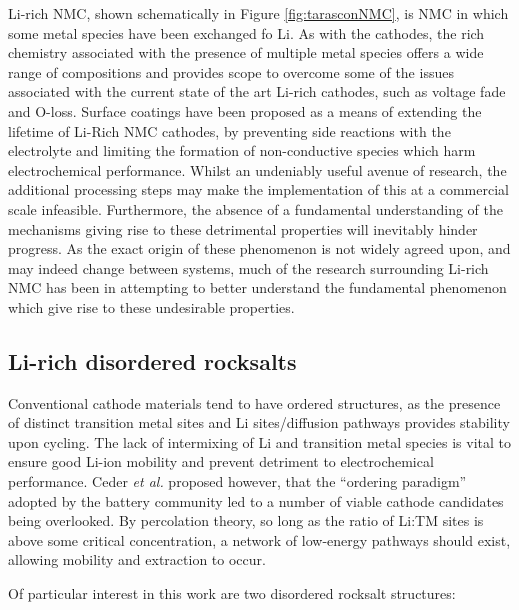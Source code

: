Li-rich NMC, shown schematically in Figure \ref{fig:tarasconNMC}, is NMC in which some metal species have been exchanged fo Li.
As with the  cathodes, the rich chemistry associated with the presence of multiple metal species offers a wide range of compositions and provides scope to overcome some of the issues associated with the current state of the art Li-rich cathodes, such as voltage fade and O-loss.
Surface coatings have been proposed as a means of extending the lifetime of Li-Rich NMC cathodes, by preventing side reactions with the electrolyte and limiting the formation of non-conductive species which harm electrochemical performance.
Whilst an undeniably useful avenue of research, the additional processing steps may make the implementation of this at a commercial scale infeasible.
Furthermore, the absence of a fundamental understanding of the mechanisms giving rise to these detrimental properties will inevitably hinder progress.
As the exact origin of these phenomenon is not widely agreed upon, and may indeed change between systems, much of the research surrounding Li-rich NMC has been in attempting to better understand the fundamental phenomenon which give rise to these undesirable properties.


\newpage
\subsection{Li-rich disordered rocksalts}
Conventional cathode materials tend to have ordered structures, as the presence of distinct transition metal sites and Li sites/diffusion pathways provides stability upon cycling.
The lack of intermixing of Li and transition metal species is vital to ensure good Li-ion mobility and prevent detriment to electrochemical performance.
Ceder \textit{et al.}\cite{Casimir2014} proposed however, that the ``ordering paradigm'' adopted by the battery community led to a number of viable cathode candidates being overlooked.
By percolation theory, so long as the ratio of Li:TM sites is above some critical concentration, a network of low-energy pathways should exist, allowing mobility and extraction to occur.\cite{Urban2014}

Of particular interest in this work are two disordered rocksalt structures:

